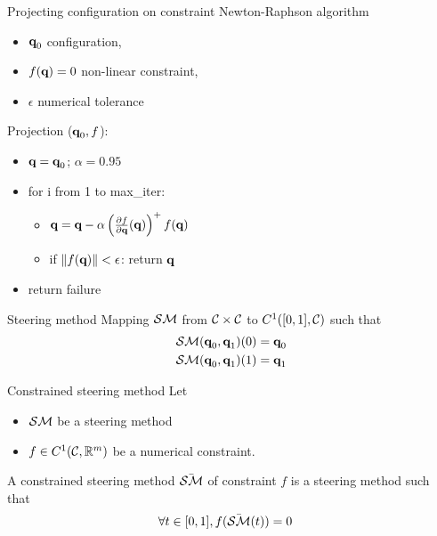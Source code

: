 %
%

\begin {frame} {Projecting configuration on constraint}
  Newton-Raphson algorithm
  \begin {itemize}
  \item $\textbf{q}_0$ configuration,
  \item $f(\textbf{q}) = 0$ non-linear constraint,
  \item $\epsilon$ numerical tolerance
  \end {itemize}
  Projection ($\textbf{q}_0, f$):
  \begin{itemize}
    \item [] $\textbf{q} = \textbf{q}_0$; $\alpha = 0.95$
    \item [] for i from 1 to max\_iter:
      \begin {itemize}
      \item [] $\textbf{q} = \textbf{q} - \alpha \left(\frac {\partial f}{\partial \textbf{q}}(\textbf{q})\right)^{+} f (\textbf{q})$
      \item [] if $\|f(\textbf{q})\| < \epsilon$: return $\textbf{q}$
      \end {itemize}
    \item [] return failure
  \end{itemize}

\end {frame}

%
%

\begin {frame} {Steering method}
  Mapping $\mathcal{SM}$ from ${\cal C}\times{\cal C}$ to $C^1([0,1],{\cal C})$ such that
  \begin {align*}
    \mathcal{SM} (\textbf{q}_0,\textbf{q}_1) (0) &= \textbf{q}_0 \\
    \mathcal{SM} (\textbf{q}_0,\textbf{q}_1) (1) &= \textbf{q}_1 \\
  \end {align*}
\end {frame}

%
%

\begin {frame} {Constrained steering method}
  Let
  \begin {itemize}
  \item $\mathcal{SM}$ be a steering method
  \item $f\in C^1({\cal C},\mathbb{R}^m)$ be a numerical constraint.
  \end {itemize}
  A constrained steering method $\bar{\mathcal{SM}}$ of constraint $f$ is a steering method such that
  \begin {align*}
    \forall t\in [0,1], f(\bar{\mathcal{SM}} (t)) &= 0
  \end {align*}
\end {frame}


